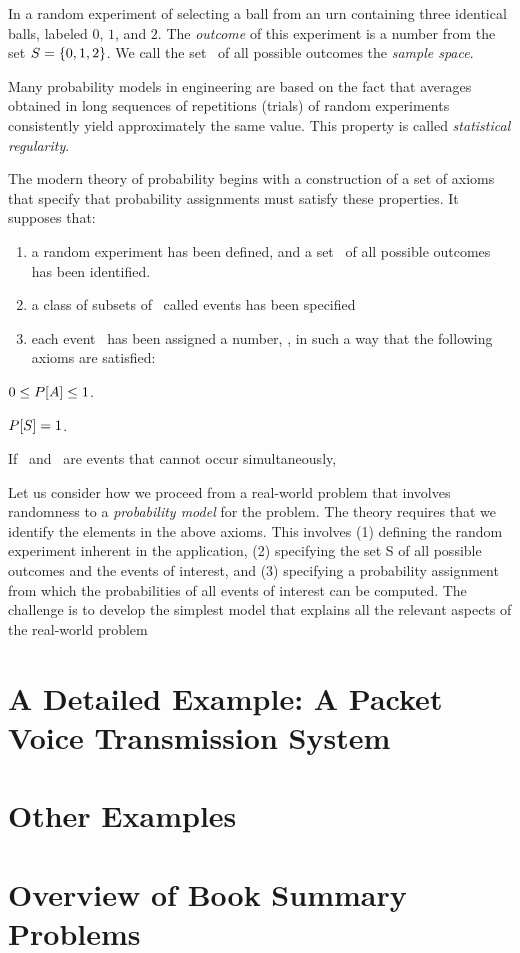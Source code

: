 	\item In a random experiment of selecting a ball from an urn
	containing three identical balls, labeled $0$, $1$, and $2$.
	The \emph{outcome} of this experiment is a number
	from the set $S = \{0, 1, 2\}$.
	We call the set \sspace\
	of all possible outcomes the \emph{sample space}.

	\item Many probability models in engineering are based on the fact
	that averages obtained
	in long sequences of repetitions (trials) of random experiments
	consistently yield approximately the same value.
	This property is called \emph{statistical regularity}.

	\item
	The modern theory of probability begins with
	a construction of a set of axioms
	that specify that probability assignments must satisfy these properties.
	It supposes that:
	\begin{enumerate}
		\item a random experiment has been defined,
		and a set \sspace\ of all possible outcomes has been identified.
		\item a class of subsets of \sspace\ called events has been specified
		\item each event \sA\ has been assigned a number,
		, in such a way that the following axioms are satisfied:
	\end{enumerate}
	\bit
		\item $0\leq P[A] \leq 1$.
		\item $P[S] = 1$.
		\item If \sA\ and \sB\ are events that cannot occur simultaneously,
	\eit

	\item
	Let us consider how we proceed from a real-world problem
	that involves randomness to a \emph{probability model} for the problem.
	The theory requires that we identify the elements in the above axioms.
	This involves (1) defining the random experiment inherent in the application, (2) specifying the set S of all possible outcomes and the events of interest, and (3) specifying a probability assignment from which the probabilities of all events of interest can be computed. The challenge is to develop the simplest model that explains all the relevant aspects of the real-world problem
\eit


\section{A Detailed Example: A Packet Voice Transmission System}
\section{Other Examples}
\section{Overview of Book Summary Problems}

